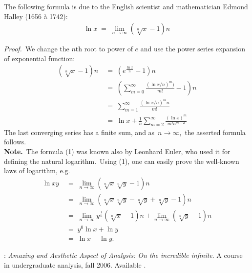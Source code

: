 \documentclass[12pt]{article}
\theoremstyle{definition}
\begin{document}
The following formula is due to the English scientist and mathematician Edmond Halley (1656 \`a 1742):
\begin{align}
\ln{x} \;=\; \lim_{n\to\infty}(\sqrt[n]{x}-1)n
\end{align}

{\it Proof.}\, We change the $n$th root to power of $e$ and use the power series expansion of exponential function:
\begin{align*}
(\sqrt[n]{x}-1)n &\;=\; (e^{\frac{\ln{x}}{n}}-1)n\\
&\;=\; \left(\sum_{m=0}^\infty\frac{(\ln{x}/n)^m)}{m!}-1\right)\!n\\ 
&\;=\; \sum_{m=1}^\infty\frac{(\ln{x}/n)^mn}{m!}\\
&\;=\; \ln{x}+\frac{1}{n}\sum_{m=2}^\infty\frac{(\ln{x})^m}{m!n^{m-2}}
\end{align*}
The last converging series has a finite sum, and as\, $n \to \infty$,\, the asserted formula follows.\\

\textbf{Note.}\, The formula (1) was known also by Leonhard Euler, who used it for defining the natural logarithm.\, Using  (1), one can easily prove the well-known laws of logarithm, e.g.
\begin{align*}
\ln{xy} &\;=\; \lim_{n\to\infty}(\sqrt[n]{x}\sqrt[n]{y}-1)n\\
&\;=\; \lim_{n\to\infty}(\sqrt[n]{x}\sqrt[n]{y}-\sqrt[n]{y}+\sqrt[n]{y}-1)n\\
&\;=\; \lim_{n\to\infty}y^{\frac{1}{n}}(\sqrt[n]{x}-1)n+\lim_{n\to\infty}(\sqrt[n]{y}-1)n\\
&\;=\; y^0\ln{x}+\ln{y}\\
&\;=\; \ln{x}+\ln{y}.
\end{align*}


\begin{thebibliography}{8}
: {\em Amazing and Aesthetic Aspect of Analysis: On the incredible infinite}. A course in undergraduate analysis, fall 2006.  Available .
\end{thebibliography}

\end{document}
